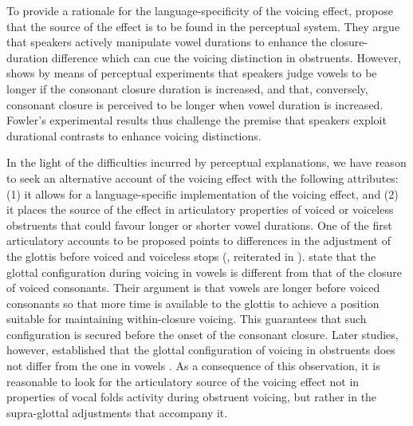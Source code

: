 \documentclass[authoryear, twocolumn]{elsarticle}
\begin{document}
To provide a rationale for the language-specificity of the voicing
effect, \citet{kluender1988} propose that the source of the effect is to
be found in the perceptual system. They argue that speakers actively
manipulate vowel durations to enhance the closure-duration difference
which can cue the voicing distinction in obstruents. However,
\citet{fowler1992} shows by means of perceptual experiments that
speakers judge vowels to be longer if the consonant closure duration is
increased, and that, conversely, consonant closure is perceived to be
longer when vowel duration is increased. Fowler's experimental results
thus challenge the premise that speakers exploit durational contrasts to
enhance voicing distinctions.

In the light of the difficulties incurred by perceptual explanations, we
have reason to seek an alternative account of the voicing effect with
the following attributes: (1) it allows for a language-specific
implementation of the voicing effect, and (2) it places the source of
the effect in articulatory properties of voiced or voiceless obstruents
that could favour longer or shorter vowel durations. One of the first
articulatory accounts to be proposed points to differences in the
adjustment of the glottis before voiced and voiceless stops
(\citealt{halle1967}, reiterated in \citealt{chomsky1968}).
\citet{halle1967} state that the glottal configuration during voicing in
vowels is different from that of the closure of voiced consonants. Their
argument is that vowels are longer before voiced consonants so that more
time is available to the glottis to achieve a position suitable for
maintaining within-closure voicing. This guarantees that such
configuration is secured before the onset of the consonant closure.
Later studies, however, established that the glottal configuration of
voicing in obstruents does not differ from the one in vowels
\citep{lisker1974,kagaya1975}. As a consequence of this observation, it
is reasonable to look for the articulatory source of the voicing effect
not in properties of vocal folds activity during obstruent voicing, but
rather in the supra-glottal adjustments that accompany it.
\end{document}
